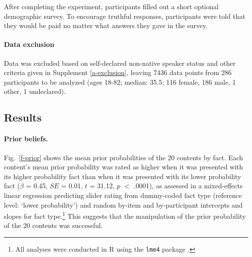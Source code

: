 \documentclass[11pt,fleqn]{article}
\newcommand{\figref}[1]{Fig.~\ref{#1}}
\newcommand{\6}{\mbox{$[\hspace*{-.6mm}[$}}
\newcommand{\9}{\mbox{$]\hspace*{-.6mm}]$}}
\begin{document}
After completing the experiment, participants filled out a short optional demographic survey. %
To encourage truthful responses, participants were told that they would be paid no matter what answers they gave in the survey.

\paragraph{Data exclusion} Data was excluded based on self-declared non-native speaker status and other criteria given in Supplement \ref{a-exclusion}, leaving 7436 data points from 286 participants to be analyzed (ages 18-82; median: 35.5; 116 female, 186 male, 1 other, 1 undeclared).

\subsection{Results}

\paragraph{Prior beliefs.}  \figref{f-prior} shows the mean prior probabilities of the 20 contents by fact. Each content's mean prior probability  was rated as higher when it was presented with its higher probability fact than when it was presented with its lower probability fact ($\beta$ = 0.45, $SE$ = 0.01, $t$ = 31.12, $p$ $<$ .0001), as assessed in a mixed-effects linear regression predicting slider rating from dummy-coded fact type (reference level: `lower probability') and random by-item and by-participant intercepts and slopes for fact type.\footnote{All analyses were conducted in R \cite{R} using the \texttt{lme4} package \cite{lme4}.} This suggests that the manipulation of the prior probability of the 20 contents was successful. 
\end{document}
